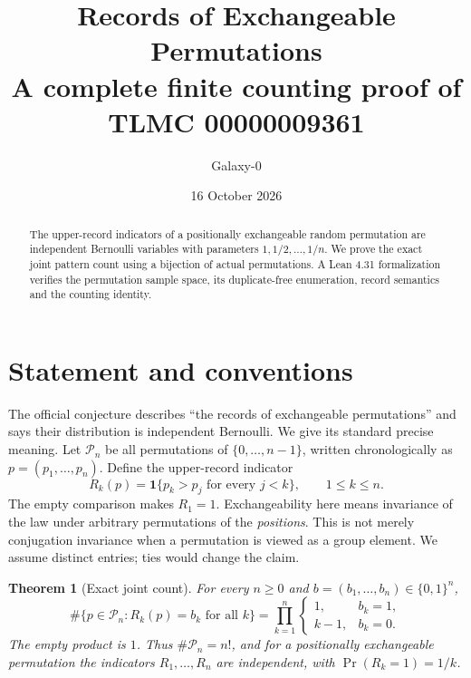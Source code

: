 \documentclass[11pt]{article}
\title{Records of Exchangeable Permutations\\\large A complete finite counting proof of TLMC 00000009361}
\author{Galaxy-0}
\date{16 October 2026}
\newtheorem{theorem}{Theorem}
\begin{document}
\maketitle
\begin{abstract}
The upper-record indicators of a positionally exchangeable random permutation
are independent Bernoulli variables with parameters $1,1/2,\ldots,1/n$.
We prove the exact joint pattern count using a bijection of actual
permutations. A Lean 4.31 formalization verifies the permutation sample space,
its duplicate-free enumeration, record semantics and the counting identity.
\end{abstract}
\section{Statement and conventions}
The official conjecture describes ``the records of exchangeable permutations''
and says their distribution is independent Bernoulli. We give its standard
precise meaning. Let $\mathcal P_n$ be all permutations of $\{0,\ldots,n-1\}$,
written chronologically as $p=(p_1,\ldots,p_n)$. Define the upper-record
indicator
\[
 R_k(p)=\mathbf 1\{p_k>p_j\text{ for every }j<k\},\qquad 1\leq k\leq n.
\]
The empty comparison makes $R_1=1$. Exchangeability here means invariance
of the law under arbitrary permutations of the \emph{positions}. This is
not merely conjugation invariance when a permutation is viewed as a group
element. We assume distinct entries; ties would change the claim.
\begin{theorem}[Exact joint count]
For every $n\geq0$ and $b=(b_1,\ldots,b_n)\in\{0,1\}^n$,
\begin{equation}\label{eq:count}
 \#\{p\in\mathcal P_n:R_k(p)=b_k\text{ for all }k\}
 =\prod_{k=1}^n \begin{cases}1,&b_k=1,\\ k-1,&b_k=0.\end{cases}
\end{equation}
The empty product is $1$. Thus $\#\mathcal P_n=n!$, and for a positionally
exchangeable permutation the indicators $R_1,\ldots,R_n$ are independent,
with $\Pr(R_k=1)=1/k$.
\end{theorem}
\end{document}
